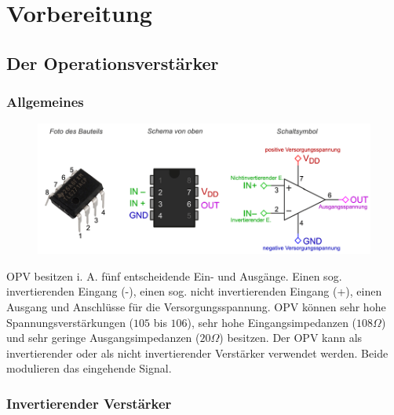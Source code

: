 \chapter{Vorbereitung}
\section{Der Operationsverstärker}
\subsection{Allgemeines}

\begin{figure}[H]
     \centering
     \includegraphics[width=1\textwidth]{Abb/opamp.pdf}
     \label{opamp}
\end{figure}
OPV besitzen i. A. fünf entscheidende Ein- und Ausgänge. Einen sog. invertierenden Eingang (-), einen sog. nicht invertierenden Eingang (+), einen Ausgang und Anschlüsse für die Versorgungsspannung.
OPV können sehr hohe Spannungsverstärkungen ($105$ bis $106$), sehr hohe Eingangsimpedanzen ($108 \Omega$) und sehr geringe Ausgangsimpedanzen ($20 \Omega$) besitzen. 
Der OPV kann als invertierender oder als nicht invertierender Verstärker verwendet werden. Beide modulieren das eingehende Signal.

\subsection{Invertierender Verstärker}


